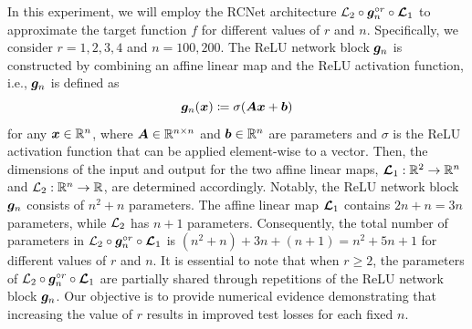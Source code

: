 \documentclass[nohyperref]{article}
\theoremstyle{plain}
\theoremstyle{definition}
\theoremstyle{remark}
\begin{document}
In this experiment, we will employ the RCNet architecture ${\mathcal{L}}_2\circ{\bm{g}}_n^{\circ r}\circ{\bm{\mathcal{L}}}_1$ to approximate the target function $f$ for different values of $r$ and $n$.
Specifically, we consider $r=1,2,3,4$ and $n=100,200$.
The ReLU network block ${\bm{g}}_n$ is constructed by combining an affine linear map and the ReLU activation function, i.e., ${\bm{g}}_n$ is defined as
\begin{equation*}   
    {\bm{g}}_n({\bm{x}})\coloneqq\sigma(\bm{A} {\bm{x}}+{\bm{b}})
\end{equation*}
for any $\bmx\in\R^{n}$, where $\bmA\in\R^{n\times n}$ and $\bmb\in\R^{n}$ are parameters and $\sigma$ is the ReLU activation function that can be applied element-wise to a vector.
Then, the dimensions of the input and output for the two affine linear maps, $\bmcalL_1:\R^2\to\R^{n}$ and $\calL_2:\R^{n}\to\R$, are determined accordingly.
Notably, the ReLU network block ${\bm{g}}_n$ consists of $n^2+n$ parameters. The affine linear map ${\bm{\mathcal{L}}}_1$ contains $2n+n=3n$ parameters, while ${\mathcal{L}}_2$ has $n +1$ parameters. Consequently, the total number of parameters in ${\mathcal{L}}_2\circ {\bm{g}}_n^{\circ r}\circ {\bm{\mathcal{L}}}_1$ is $(n^2+n)+3n+(n+1)=n^2+5n+1$ 
for different values of $r$ and $n$.
It is essential to note that when $r\geq 2$, the parameters of ${\mathcal{L}}_2\circ {\bm{g}}_n^{\circ r}\circ {\bm{\mathcal{L}}}_1$ are partially shared through repetitions of the ReLU network block ${\bm{g}}_n$. Our objective is to provide numerical evidence demonstrating that increasing the value of $r$ results in improved test losses for each fixed $n$.
\end{document}
